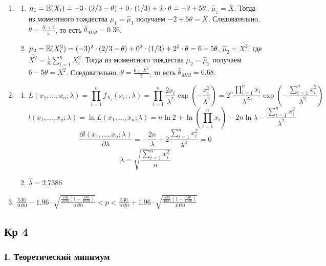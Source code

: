 \documentclass[12pt, a4paper]{article}\usepackage[]{graphicx}\usepackage[]{color}
\begin{document}
\begin{enumerate}
\item \begin{enumerate}
\item $\mu_1 = \mathbb{E}(X_i) = -3 \cdot (2/3 - \theta) + 0\cdot(1/3) + 2\cdot \theta = -2+ 5\theta$, $\hat{\mu}_1 = \overline{X}$. Тогда
из моментного тождества $\mu_1 = \hat{\mu}_1$ получаем $-2+5\theta=\overline{X}$. Следовательно,
$\theta = \frac{\overline{X}+2}{5}$, то есть $\hat{\theta}_{MM} = 0.36$.
\item  $\mu_2 = \mathbb{E}(X_i^2) = (-3)^2 \cdot (2/3 - \theta) + 0^2\cdot(1/3) + 2^2 \cdot \theta = 6 - 5\theta$, $\hat{\mu}_2 = \overline{X^2}$,
где $\overline{X^2} = \frac{1}{n} \sum_{i=1}^{n}X_i^2$. Тогда из моментного тождества $\mu_2 = \hat{\mu}_2$ получаем $6-5\theta=\overline{X^2}$. Следовательно,
$\theta = \frac{6-\overline{X^2}}{5}$, то есть $\hat{\theta}_{MM} = 0.68$.
\end{enumerate}
\item \begin{enumerate}
\item \[
L(x_1, \ldots, x_n; \lambda) = \prod_{i=1}^{n} f_{X_i} (x_i;, \lambda) = \prod_{i=1}^{n} \frac{2x_i}{\lambda^2} \exp \left(-\frac{x_i^2}{\lambda^2} \right) = 2^n \frac{\prod_{i=1}^{n} x_i}{\lambda^{2n}} \exp \left(-\frac{\sum_{i=1}^{n} x_i^2}{\lambda^{2}}\right)
\]
\[
l(x_1, \ldots, x_n; \lambda) = \ln L(x_1, \ldots, x_n; \lambda) = n \ln 2 + \ln \left(\prod_{i=1}^n x_i\right) - 2n \ln \lambda - \frac{\sum_{i=1}^{n} x_i^2}{\lambda^{2}}
\]
\[
\frac{\partial l(x_1, \ldots, x_n; \lambda)}{\partial \lambda} = -\frac{2n}{\lambda} + 2 \frac{\sum_{i=1}^{n} x_i^2}{\lambda^3}=0
\]
\[
\lambda = \sqrt{\frac{\sum_{i=1}^{n} x_i^2}{n}}
\]
\item $\hat{\lambda} = 2.7386$
\end{enumerate}
\item $\frac{530}{1020} - 1.96\cdot \sqrt{\frac{\frac{530}{1020}\left(1-\frac{530}{1020}\right)}{1020}} < p < \frac{530}{1020} + 1.96\cdot \sqrt{\frac{\frac{530}{1020}\left(1-\frac{530}{1020}\right)}{1020}}$
\end{enumerate}





\subsection{Кр 4}


\subsubsection*{I. Теоретический минимум}
\end{document}
